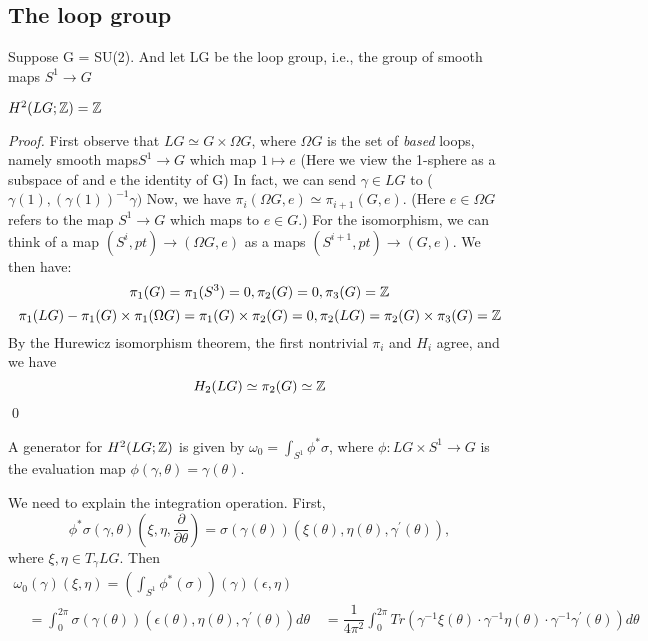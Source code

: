 \subsection{The loop group}Suppose G = SU(2). And let LG be the loop group, i.e., the group of smooth maps
$S^1 \rightarrow G$
\begin{lemma}
$H^{2}(LG;\mathbb{Z}) = \mathbb{Z}$
\begin{proof}
First observe that $LG \simeq G \times \Omega G$, where $\Omega G$ is the set of \textit{based} loops,
namely smooth maps$S^1 \rightarrow G$ which map $1 \mapsto e$ (Here we view the 1-sphere as a subspace of \Cbb and 
e the identity of G)
In fact, we can send $\gamma \in LG$ to ($\gamma(1), (\gamma(1))^{-1}\gamma)$
Now, we have $\pi_{i}(\Omega G,e) \simeq \pi_{i+1}(G,e)$. (Here $e \in \Omega G$ refers to the map $S^{1} \rightarrow G$
which maps to $e \in G$.) For the isomorphism, we can think of a map $(S^i,pt) \rightarrow (\Omega G, e)$ as a maps
$(S^{i+1}, pt) \rightarrow (G,e). $
 We then have: 
 \begin{equation*}
  \pi_{1}(G) = \pi_{1}(S^{3}) = 0, 
  \pi_2(G) = 0, \pi_3(G) = \mathbb{Z}
 \end{equation*}
\begin{equation*}
 \pi_1(LG) - \pi_1(G) \times \pi_1(\Omega G) = \pi_1(G) \times \pi_2(G) = 0, \pi_2(LG) = \pi_2(G) \times \pi_3(G) = \mathbb{Z}
\end{equation*}
By the Hurewicz isomorphism theorem, the first nontrivial $\pi_i$ and $H_i$ agree, and we have
\begin{equation*}
 H_2(LG) \simeq \pi_2(G) \simeq \mathbb{Z}
\end{equation*}
\qed
\end{proof}
\end{lemma}
\begin{lemma}
 A generator for $H^2(LG;\mathbb{Z})$ is given by $\omega_0 = \int_{S^{1}} \phi^{*}\sigma$, where $\phi: LG \times S^1 \rightarrow 
 G$ is the evaluation map $\phi(\gamma, \theta) = \gamma(\theta)$.
\end{lemma}
We need to explain the integration operation. First,
\begin{equation*}
 \phi^{*}{\sigma}(\gamma,\theta)\left(\xi, \eta, \dfrac{\partial}{\partial \theta} \right) = \sigma(\gamma(\theta))(\xi
 (\theta),\eta(\theta),\gamma^{'}(\theta)),
\end{equation*}
where $\xi, \eta \in T_{\gamma}LG$. Then
\begin{eqnarray*}
 \omega_{0}(\gamma)(\xi, \eta) = \left(\int_{S^{1}} \phi^{*}(\sigma) \right)(\gamma)(\epsilon, \eta)\\
\quad = \int_{0}^{2\pi} \sigma(\gamma(\theta))(\epsilon(\theta), \eta(\theta), \gamma^{'}(\theta))d\theta
 \quad = \dfrac{1}{4\pi^{2}}\int_{0}^{2\pi} Tr(\gamma^{-1}\xi(\theta)\cdot \gamma^{-1}\eta(\theta)\cdot \gamma^{-1}\gamma^{'}(\theta))d\theta
\end{eqnarray*}
